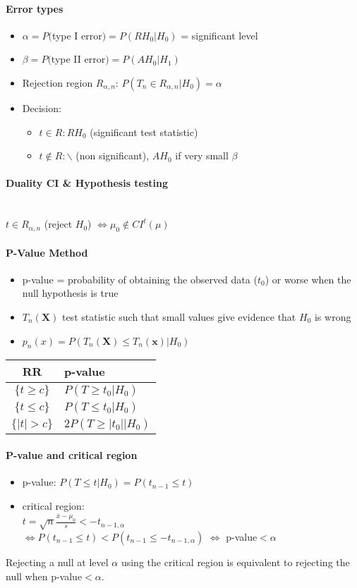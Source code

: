 \documentclass[paper=a4,fontsize=8pt,pagesize,DIV=calc]{scrartcl}
\newcounter{row}
\begin{document}
\begin{multicols}{3}
\paragraph{Error types}
\begin{itemize}
\item $\alpha=P($type I error$)=P(RH_0|H_0)$ = significant level
\item $\beta=P($type II error$)=P(AH_0|H_1)$
\item Rejection region $R_{\alpha,n}$: $P(T_n\in R_{\alpha,n}|H_0)=\alpha$\item Decision:
\begin{itemize}
\item $t \in R: RH_0$ (significant test statistic)
\item $t \notin R: \backslash $ (non significant), $AH_0$ if very small  $\beta$
\end{itemize}
\end{itemize}
\paragraph{Duality CI \& Hypothesis testing}~~\\
$t\in R_{\alpha,n}$ (reject $H_0$) $\Leftrightarrow \mu_0\notin CI^t(\mu)$
\paragraph{P-Value Method} 
\begin{itemize}
\item p-value = probability of obtaining the observed data ($t_0$) or worse when the null hypothesis is true
\item $T_n(\textbf{X})$ test statistic such that small values give evidence that $H_0$ is wrong
\item $p_n(x)=P(T_n(\textbf{X})\leq T_n(\textbf{x})|H_0)$
\end{itemize}

\begin{tabular}{|c|l|}
\hline
RR&p-value\\
\hline
$\{t\geq c\}$ & $P(T\geq t_0|H_0)$\\
$\{t\leq c\}$ & $P(T\leq t_0|H_0)$\\
$\{|t|>c\}$ & $2P(T\geq |t_0||H_0)$\\
\hline
\end{tabular}
\vspace{0.1cm}
\paragraph{P-value and critical region} 
\begin{itemize}
\item p-value: $P(T\leq t|H_0)=P(t_{n-1}\leq t)$
\item critical region:\\
$t=\sqrt{n}\frac{\bar{x}-\mu_0}{s}<-t_{n-1,\alpha}$\\
$\Leftrightarrow P(t_{n-1}\leq t)<P(t_{n-1}\leq -t_{n-1,\alpha})$
$\Leftrightarrow$ p-value$<\alpha$
\end{itemize}
Rejecting a null at level $\alpha$ using the critical region is equivalent to rejecting the null when p-value$<\alpha$.


\end{multicols}
\end{document}
